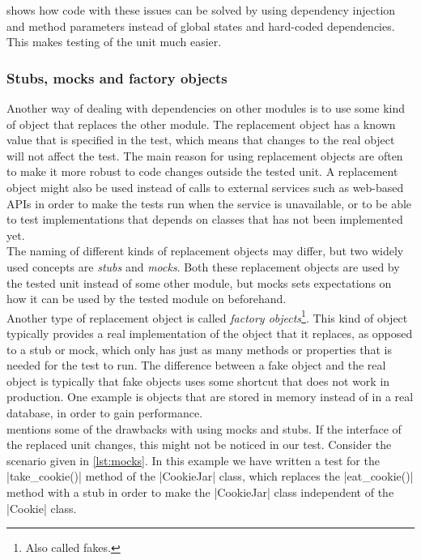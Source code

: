 \citeauthor{video:misko_psychology} shows how code with these issues can
be solved by using dependency injection and method parameters instead
of global states and hard-coded dependencies. This makes testing of the
unit much easier.\\


\subsubsection{Stubs, mocks and factory objects}
\label{sec:theory_mocks}

Another way of dealing with dependencies on other modules is to use some
kind of object that replaces the other module. The replacement object
has a known value that is specified in the test, which means that
changes to the real object will not affect the test. The main reason for
using replacement objects are often to make it more robust to code
changes outside the tested unit. A replacement object might also be used
instead of calls to external services such as web-based APIs in order
to make the tests run when the service is unavailable, or to be able to
test implementations that depends on classes that has not been
implemented yet.\\

The naming of different kinds of replacement objects may differ, but two
widely used concepts are \emph{stubs} and \emph{mocks}. Both these
replacement objects are used by the tested unit instead of some other
module, but mocks sets expectations on how it can be used by the tested
module on beforehand. \cite{web:mocks_arent_stubs}\\

Another type of replacement object is called
\emph{factory objects}\footnote{Also called fakes.}.
This kind of object typically provides a real implementation of the
object that it replaces, as opposed to a stub or mock, which only has
just as many methods or properties that is needed for the test to run.
The difference between a fake object and the real object is typically
that fake objects uses some shortcut that does not work in production.
One example is objects that are stored in memory instead of in a real
database, in order to gain performance. \cite{web:mocks_arent_stubs}\\

\citet{video:boundaries} mentions some of the drawbacks with using mocks
and stubs. If the interface of the replaced unit changes, this might not
be noticed in our test. Consider the scenario given in \ref{lst:mocks}.
In this example we have written a test for the |take_cookie()| method of
the |CookieJar| class, which replaces the |eat_cookie()| method with a
stub in order to make the |CookieJar| class independent of the |Cookie|
class.\\

